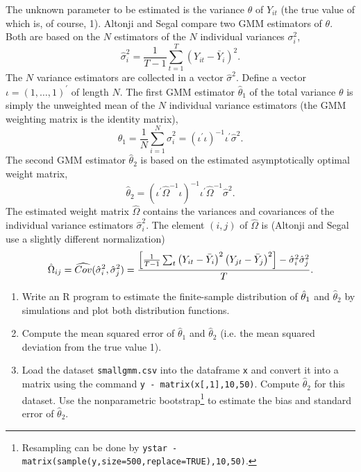 \documentclass{article}
\begin{document}
The unknown parameter to be estimated is the variance $\theta $ of $Y_{it}$
(the true value of which is, of course, 1). Altonji and Segal compare two
GMM estimators of $\theta $. Both are based on the $N$ estimators of the $N$
individual variances $\sigma _{i}^{2}$, 
\begin{equation*}
\hat{\sigma}_{i}^{2}=\frac{1}{T-1}\sum_{t=1}^{T}\left( Y_{it}-\bar{Y}%
_{i}\right) ^{2}.
\end{equation*}%
The $N$ variance estimators are collected in a vector $\hat{\sigma}^{2}$.
Define a vector $\iota =(1,\ldots ,1)^{\prime }$ of length $N$. The first
GMM estimator $\hat{\theta}_{1}$ of the total variance $\theta $ is simply
the unweighted mean of the $N$ individual variance estimators (the GMM
weighting matrix is the identity matrix),%
\begin{equation*}
\hat{\theta}_{1}=\frac{1}{N}\sum_{i=1}^{N}\hat{\sigma}_{i}^{2}=\left( \iota
^{\prime }\iota \right) ^{-1}\iota ^{\prime }\hat{\sigma}^{2}.
\end{equation*}%
The second GMM estimator $\hat{\theta}_{2}$ is based on the estimated
asymptotically optimal weight matrix,%
\begin{equation*}
\hat{\theta}_{2}=\left( \iota ^{\prime }\hat{\Omega}^{-1}\iota \right)
^{-1}\iota ^{\prime }\hat{\Omega}^{-1}\hat{\sigma}^{2}.
\end{equation*}%
The estimated weight matrix $\hat{\Omega}$ contains the variances and
covariances of the individual variance estimators $\hat{\sigma}_{i}^{2}$.
The element $(i,j)$ of $\hat{\Omega}$ is (Altonji and Segal use a slightly
different normalization)%
\begin{equation*}
\hat{\Omega}_{ij}=\widehat{Cov}(\hat{\sigma}_{i}^{2},\hat{\sigma}_{j}^{2})=%
\frac{\left[ \frac{1}{T-1}\sum_{t}\left( Y_{it}-\bar{Y}_{i}\right)
^{2}\left( Y_{jt}-\bar{Y}_{j}\right) ^{2}\right] -\hat{\sigma}_{i}^{2}\hat{%
\sigma}_{j}^{2}}{T}.
\end{equation*}

\begin{enumerate}
\item Write an R program to estimate the finite-sample distribution of $\hat{%
\theta}_{1}$ and $\hat{\theta}_{2}$ by simulations and plot both
distribution functions.

\item Compute the mean squared error of $\hat{\theta}_{1}$ and $\hat{\theta}%
_{2}$ (i.e. the mean squared deviation from the true value 1).

\item Load the dataset \texttt{smallgmm.csv} into the dataframe \texttt{x}
and convert it into a matrix using the command \texttt{y \TEXTsymbol{<}-
matrix(x[,1],10,50)}. Compute $\hat{\theta}_{2}$ for this dataset. Use the
nonparametric bootstrap\footnote{%
Resampling can be done by \texttt{ystar \TEXTsymbol{<}-
matrix(sample(y,size=500,replace=TRUE),10,50)}.} to estimate the bias and
standard error of $\hat{\theta}_{2}$.\newpage 
\end{enumerate}
\end{document}
